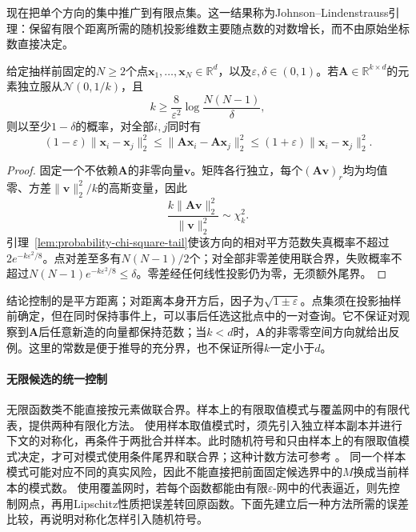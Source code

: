 现在把单个方向的集中推广到有限点集。这一结果称为Johnson--Lindenstrauss引理：保留有限个距离所需的随机投影维数主要随点数的对数增长，而不由原始坐标数直接决定。
\begin{theorem}[高斯随机投影的距离保持]
  \label{thm:probability-johnson-lindenstrauss}
  给定抽样前固定的\(N\geq2\)个点\(\bm x_1,\ldots,\bm x_N\in\mathbb R^d\)，以及\(\varepsilon,\delta\in(0,1)\)。若\(\bm A\in\mathbb R^{k\times d}\)的元素独立服从\(\mathcal N(0,1/k)\)，且
  \[
    k\geq\frac8{\varepsilon^2}\log\frac{N(N-1)}\delta,
  \]
  则以至少\(1-\delta\)的概率，对全部\(i,j\)同时有
  \begin{equation}
    (1-\varepsilon)\|\bm x_i-\bm x_j\|_2^2
    \leq\|\bm A\bm x_i-\bm A\bm x_j\|_2^2
    \leq(1+\varepsilon)\|\bm x_i-\bm x_j\|_2^2.
    \label{eq:probability-jl-distance-preservation}
  \end{equation}
\end{theorem}
\begin{proof}
固定一个不依赖\(\bm A\)的非零向量\(\bm v\)。矩阵各行独立，每个\((\bm A\bm v)_r\)均为均值零、方差\(\|\bm v\|_2^2/k\)的高斯变量，因此
\[
  \frac{k\|\bm A\bm v\|_2^2}{\|\bm v\|_2^2}\sim\chi_k^2.
\]
引理~\ref{lem:probability-chi-square-tail}使该方向的相对平方范数失真概率不超过\(2e^{-k\varepsilon^2/8}\)。点对差至多有\(N(N-1)/2\)个；对全部非零差使用联合界，失败概率不超过\(N(N-1)e^{-k\varepsilon^2/8}\leq\delta\)。零差经任何线性投影仍为零，无须额外尾界。
\end{proof}
结论控制的是平方距离；对距离本身开方后，因子为\(\sqrt{1\pm\varepsilon}\)。点集须在投影抽样前确定，但在同时保持事件上，可以事后任选这批点中的一对查询。它不保证对观察到\(\bm A\)后任意新造的向量都保持范数；当\(k<d\)时，\(\bm A\)的非零零空间方向就给出反例。这里的常数是便于推导的充分界，也不保证所得\(k\)一定小于\(d\)。

\paragraph{无限候选的统一控制}
无限函数类不能直接按元素做联合界。样本上的有限取值模式与覆盖网中的有限代表，提供两种有限化方法。
使用样本取值模式时，须先引入独立样本副本并进行下文的对称化，再条件于两批合并样本。此时随机符号和只由样本上的有限取值模式决定，才可对模式使用条件尾界和联合界；这种计数方法可参考
。
同一个样本模式可能对应不同的真实风险，因此不能直接把前面固定候选界中的\(M\)换成当前样本的模式数。
使用覆盖网时，若每个函数都能由有限\(\varepsilon\)-网中的代表逼近，则先控制网点，再用Lipschitz性质把误差转回原函数。下面先建立后一种方法所需的误差比较，再说明对称化怎样引入随机符号。

